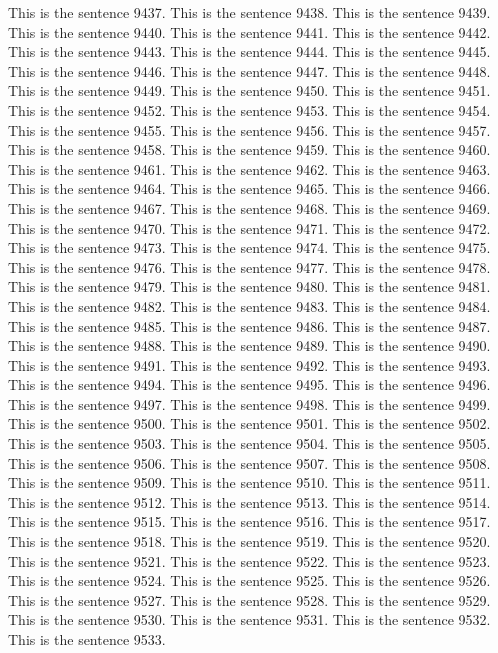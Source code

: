 \documentclass{article}
\begin{document}
This is the sentence 9437.
This is the sentence 9438.
This is the sentence 9439.
This is the sentence 9440.
This is the sentence 9441.
This is the sentence 9442.
This is the sentence 9443.
This is the sentence 9444.
This is the sentence 9445.
This is the sentence 9446.
This is the sentence 9447.
This is the sentence 9448.
This is the sentence 9449.
This is the sentence 9450.
This is the sentence 9451.
This is the sentence 9452.
This is the sentence 9453.
This is the sentence 9454.
This is the sentence 9455.
This is the sentence 9456.
This is the sentence 9457.
This is the sentence 9458.
This is the sentence 9459.
This is the sentence 9460.
This is the sentence 9461.
This is the sentence 9462.
This is the sentence 9463.
This is the sentence 9464.
This is the sentence 9465.
This is the sentence 9466.
This is the sentence 9467.
This is the sentence 9468.
This is the sentence 9469.
This is the sentence 9470.
This is the sentence 9471.
This is the sentence 9472.
This is the sentence 9473.
This is the sentence 9474.
This is the sentence 9475.
This is the sentence 9476.
This is the sentence 9477.
This is the sentence 9478.
This is the sentence 9479.
This is the sentence 9480.
This is the sentence 9481.
This is the sentence 9482.
This is the sentence 9483.
This is the sentence 9484.
This is the sentence 9485.
This is the sentence 9486.
This is the sentence 9487.
This is the sentence 9488.
This is the sentence 9489.
This is the sentence 9490.
This is the sentence 9491.
This is the sentence 9492.
This is the sentence 9493.
This is the sentence 9494.
This is the sentence 9495.
This is the sentence 9496.
This is the sentence 9497.
This is the sentence 9498.
This is the sentence 9499.
This is the sentence 9500.
This is the sentence 9501.
This is the sentence 9502.
This is the sentence 9503.
This is the sentence 9504.
This is the sentence 9505.
This is the sentence 9506.
This is the sentence 9507.
This is the sentence 9508.
This is the sentence 9509.
This is the sentence 9510.
This is the sentence 9511.
This is the sentence 9512.
This is the sentence 9513.
This is the sentence 9514.
This is the sentence 9515.
This is the sentence 9516.
This is the sentence 9517.
This is the sentence 9518.
This is the sentence 9519.
This is the sentence 9520.
This is the sentence 9521.
This is the sentence 9522.
This is the sentence 9523.
This is the sentence 9524.
This is the sentence 9525.
This is the sentence 9526.
This is the sentence 9527.
This is the sentence 9528.
This is the sentence 9529.
This is the sentence 9530.
This is the sentence 9531.
This is the sentence 9532.
This is the sentence 9533.
\end{document}
